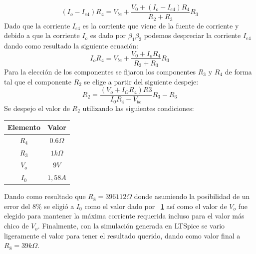 \documentclass[e2_tp1_main.tex]{subfiles}
\begin{document}
$$(I_o - I_{e4})R_4=V_{be}+\frac{V_0+(I_o - I_{e4})R_4}{R_2+R_3}R_3$$
Dado que la corriente $I_{e4}$ es la corriente que viene de la fuente de corriente y debido a que la corriente $I_o$ es dado por $\beta_1\beta_2$ podemos despreciar la corriente $I_{e4}$ dando como resultado la siguiente ecuación:
$$I_oR_4=V_{be}+\frac{V_0+I_oR_4}{R_2+R_3}R_3$$
Para la elección de los componentes se fijaron los componentes $R_3$ y $R_4$ de forma tal que el componente $R_2$ se elige a partir del siguiente despeje:
$$R_2=\frac{(V_o+I_OR_4)R3}{I_0R_4-V_{be}}R_3-R_3$$
Se despejo el valor de $R_2$ utilizando las siguientes condiciones:
\begin{table}[H]
	\begin{center}
		\begin{tabular}{|c|c|}
			\hline
			Elemento & Valor\\
			\hline
			$R_4$ & $0.6\!\Omega$ \\
			\hline
			$R_3$ & $1\!k\Omega$ \\
			\hline
			$V_o$ & $9\!V$ \\
			\hline
			$I_0$ & $1,58\!A$ \\
			\hline
		\end{tabular}
		\label{tabla:CompProt}
	\end{center}
\end{table}
Dando como resultado que $R_8=396112\!\Omega$ donde asumiendo la posibilidad de un error del $8\%$ se eligió a $I_0$ como el valor dado por ~\ref{tabla:CompProt} así como el valor de $V_o$ fue elegido para mantener la máxima corriente requerida incluso para el valor más chico de $V_o$.
Finalmente, con la simulación generada en LTSpice se vario ligeramente el valor para tener el resultado querido, dando como valor final a $R_8=39\!k\Omega$.
\end{document}
